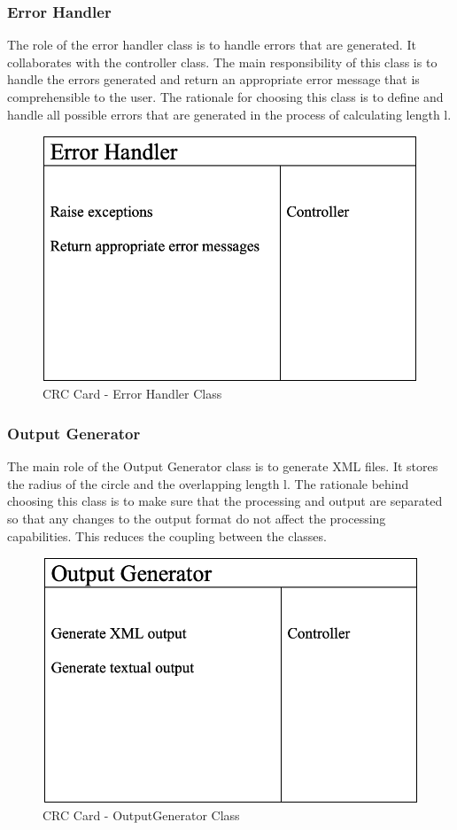     \subsubsection{Error Handler}
      \parbox{1.0\linewidth}{
        The role of the error handler class is to handle errors that are generated. It collaborates with the controller class. The main responsibility of this class is to handle the errors generated and return an appropriate error message that is comprehensible to the user. The rationale for choosing this class is to define and handle all possible errors that are generated in the process of calculating length l.
      }
      \vspace*{2em}
      \begin{figure}[h!]
        \centering
        \includegraphics[width=.5\linewidth]{resources/ErrorHandler.png}
        \caption{CRC Card - Error Handler Class}\label{fig:error}
      \end{figure}

    \subsubsection{Output Generator}
      \parbox{1.0\linewidth}{
        The main role of the Output Generator class is to generate XML files. It stores the radius of the circle and the overlapping length l. The rationale behind choosing this class is to make sure that the processing and output are separated so that any changes to the output format do not affect the processing capabilities. This reduces the coupling between the classes.
      }
      \vspace*{2em}
      \begin{figure}[h!]
        \centering
        \includegraphics[width=.5\linewidth]{resources/OutputGenerator.png}
        \caption{CRC Card - OutputGenerator Class}\label{fig:output}
      \end{figure}


